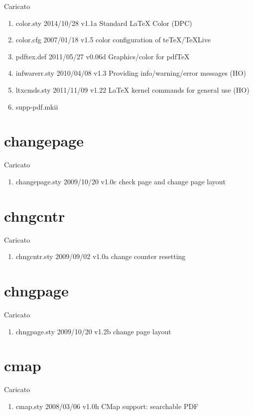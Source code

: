 Caricato 
\begin{enumerate}
\item color.sty 2014/10/28 v1.1a Standard LaTeX Color (DPC)
\item color.cfg 2007/01/18 v1.5 color configuration of teTeX/TeXLive
\item pdftex.def 2011/05/27 v0.06d Graphics/color for pdfTeX
\item infwarerr.sty 2010/04/08 v1.3 Providing info/warning/error messages (HO)
\item ltxcmds.sty 2011/11/09 v1.22 LaTeX kernel commands for general use (HO)
\item supp-pdf.mkii
\end{enumerate}
\section{changepage}

Caricato 
\begin{enumerate}
\item changepage.sty 2009/10/20 v1.0c check page and change page layout
\end{enumerate}
\section{chngcntr}

Caricato 
\begin{enumerate}
\item chngcntr.sty 2009/09/02 v1.0a change counter resetting
\end{enumerate}
\section{chngpage}

Caricato 
\begin{enumerate}
\item chngpage.sty 2009/10/20 v1.2b change page layout
\end{enumerate}
\section{cmap}

Caricato 
\begin{enumerate}
\item cmap.sty 2008/03/06 v1.0h CMap support: searchable PDF
\end{enumerate}
\lstset{language=TeX}

